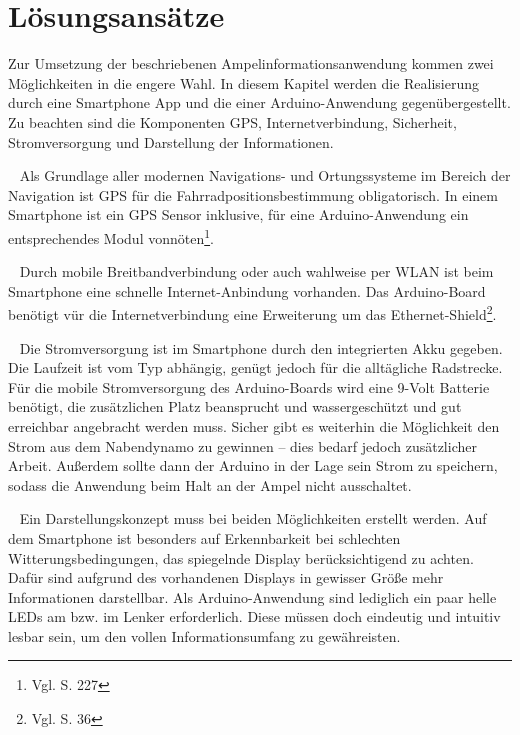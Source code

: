 \chapter{Lösungsansätze}
Zur Umsetzung der beschriebenen Ampelinformationsanwendung kommen zwei Möglichkeiten in die engere Wahl. In diesem Kapitel werden die Realisierung durch eine \gls{Smartphone} \Gls{App} und die einer \gls{Arduino}-Anwendung gegenübergestellt. Zu beachten sind die Komponenten \gls{GPS}, Internetverbindung, Sicherheit, Stromversorgung und Darstellung der Informationen.\\
\begin{description}[leftmargin=0.7cm,style=nextline]
  \item[\gls{GPS}] ~ Als Grundlage aller modernen Navigations- und Ortungssysteme im Bereich der Navigation ist \gls{GPS} für die Fahrradpositionsbestimmung obligatorisch. In einem \gls{Smartphone} ist ein \gls{GPS} Sensor inklusive, für eine \gls{Arduino}-Anwendung ein entsprechendes Modul vonnöten\footnote{ Vgl. \cite{arduino} S. 227}.\\
  \item[Internetverbindung] ~ Durch mobile Breitbandverbindung oder auch wahlweise per \gls{WLAN} ist beim \gls{Smartphone} eine schnelle Internet-Anbindung vorhanden. 
  Das \gls{Arduino}-Board benötigt vür die Internetverbindung eine Erweiterung um das Ethernet-Shield\footnote{ Vgl. \cite{arduino} S. 36}.\\
  \item[Stromversorgung] ~ Die Stromversorgung ist im \gls{Smartphone} durch den integrierten Akku gegeben. Die Laufzeit ist vom Typ abhängig, genügt jedoch für die alltägliche Radstrecke. Für die mobile Stromversorgung des \gls{Arduino}-Boards wird eine 9-Volt Batterie benötigt, die zusätzlichen Platz beansprucht und wassergeschützt und gut erreichbar angebracht werden muss. Sicher gibt es weiterhin die Möglichkeit den Strom aus dem Nabendynamo zu gewinnen -- dies bedarf jedoch zusätzlicher Arbeit. Außerdem sollte dann der \gls{Arduino} in der Lage sein Strom zu speichern, sodass die Anwendung beim Halt an der Ampel nicht ausschaltet.\\
  \item[Darstellung] ~ Ein Darstellungskonzept muss bei beiden Möglichkeiten erstellt werden. Auf dem \gls{Smartphone} ist besonders auf Erkennbarkeit bei schlechten Witterungsbedingungen, das spiegelnde Display berücksichtigend zu achten. Dafür sind aufgrund des vorhandenen Displays in gewisser Größe mehr Informationen darstellbar. Als \gls{Arduino}-Anwendung sind lediglich ein paar helle \glspl{LED} am bzw. im Lenker erforderlich. Diese müssen doch eindeutig und intuitiv lesbar sein, um den vollen Informationsumfang zu gewähreisten.

\end{description}
